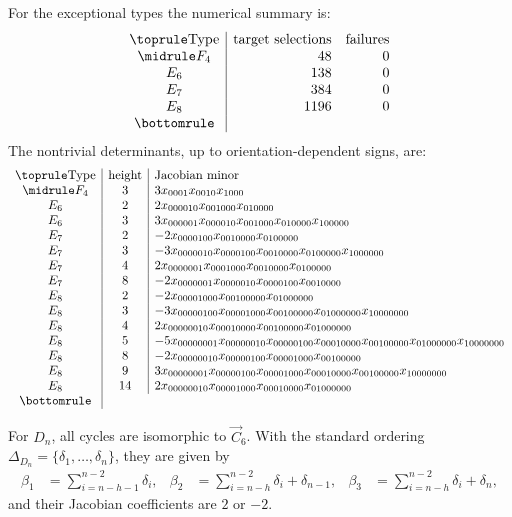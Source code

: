 For the exceptional types the numerical summary is:
\[
\begin{array}{c|rr}
\toprule
\text{Type}&\text{target selections}&\text{failures}\\
\midrule
F_4&48&0\\
E_6&138&0\\
E_7&384&0\\
E_8&1196&0\\
\bottomrule
\end{array}
\]
The nontrivial determinants, up to orientation-dependent signs, are:
\[
\begin{array}{c|c|l}
\toprule
\text{Type}&\text{height}&\text{Jacobian minor}\\
\midrule
F_4&3&3x_{0001}x_{0010}x_{1000}\\
E_6&2&2x_{000010}x_{001000}x_{010000}\\
E_6&3&3x_{000001}x_{000010}x_{001000}x_{010000}x_{100000}\\
E_7&2&-2x_{0000100}x_{0010000}x_{0100000}\\
E_7&3&-3x_{0000010}x_{0000100}x_{0010000}x_{0100000}x_{1000000}\\
E_7&4&2x_{0000001}x_{0001000}x_{0010000}x_{0100000}\\
E_7&8&-2x_{0000001}x_{0000010}x_{0000100}x_{0010000}\\
E_8&2&-2x_{00001000}x_{00100000}x_{01000000}\\
E_8&3&-3x_{00000100}x_{00001000}x_{00100000}x_{01000000}x_{10000000}\\
E_8&4&2x_{00000010}x_{00010000}x_{00100000}x_{01000000}\\
E_8&5&-5x_{00000001}x_{00000010}x_{00000100}x_{00010000}x_{00100000}x_{01000000}x_{10000000}\\
E_8&8&-2x_{00000010}x_{00000100}x_{00001000}x_{00100000}\\
E_8&9&3x_{00000001}x_{00000100}x_{00001000}x_{00010000}x_{00100000}x_{10000000}\\
E_8&14&2x_{00000010}x_{00001000}x_{00010000}x_{01000000}\\
\bottomrule
\end{array}
\]

For $D_n$, all cycles are isomorphic to $\vec C_6$.  With the standard
ordering $\Delta_{D_n}=\{\delta_1,\ldots,\delta_n\}$, they are given by
\[
\begin{aligned}
\beta_1&=\sum_{i=n-h-1}^{n-2}\delta_i,&
\beta_2&=\sum_{i=n-h}^{n-2}\delta_i+\delta_{n-1},&
\beta_3&=\sum_{i=n-h}^{n-2}\delta_i+\delta_n,
\end{aligned}
\]
and their Jacobian coefficients are $2$ or $-2$.

